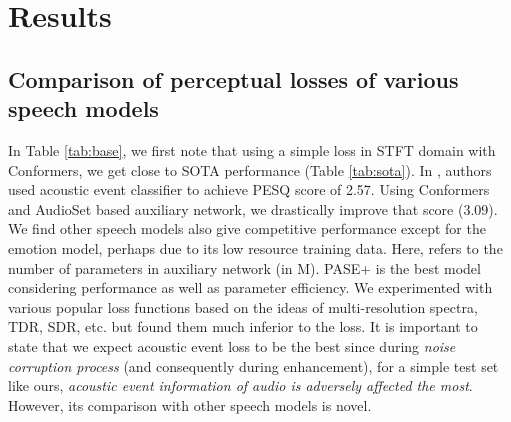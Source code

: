 \documentclass{article}
\begin{document}
\section{Results}
\subsection{Comparison of perceptual losses of various speech models}
In Table \ref{tab:base}, we first note that using a simple  loss in STFT domain with Conformers, we get close to \ac{SOTA} performance (Table \ref{tab:sota}).
In \cite{germain2018speech}, authors used acoustic event classifier to achieve \ac{PESQ} score of 2.57.
Using Conformers and AudioSet based auxiliary network, we drastically improve that score (3.09).
We find other speech models also give competitive performance except for the emotion model, perhaps due to its low resource training data.
Here,  refers to the number of parameters in auxiliary network (in M).
PASE+ is the best model considering performance as well as parameter efficiency.
We experimented with various popular loss functions based on the ideas of multi-resolution spectra, \ac{TDR}, \ac{SDR}, etc. but found them much inferior to the  loss.
It is important to state that we expect acoustic event loss to be the best since during \emph{noise corruption process} (and consequently during enhancement), for a simple test set like ours, \emph{acoustic event information of audio is adversely affected the most}.
However, its comparison with other speech models is novel.
\end{document}

